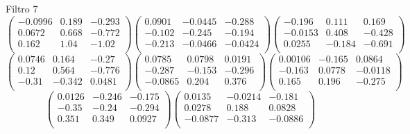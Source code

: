 Filtro 7
{ \small
\[
\begin{pmatrix}
  -0.0996 & 0.189 & -0.293 \\
  0.0672 & 0.668 & -0.772 \\
  0.162 & 1.04 & -1.02 \\
\end{pmatrix}
\begin{pmatrix}
  0.0901 & -0.0445 & -0.288 \\
  -0.102 & -0.245 & -0.194 \\
  -0.213 & -0.0466 & -0.0424 \\
\end{pmatrix}
\begin{pmatrix}
  -0.196 & 0.111 & 0.169 \\
  -0.0153 & 0.408 & -0.428 \\
  0.0255 & -0.184 & -0.691 \\
\end{pmatrix}
\]
\[
\begin{pmatrix}
  0.0746 & 0.164 & -0.27 \\
  0.12 & 0.564 & -0.776 \\
  -0.31 & -0.342 & 0.0481 \\
\end{pmatrix}
\begin{pmatrix}
  0.0785 & 0.0798 & 0.0191 \\
  -0.287 & -0.153 & -0.296 \\
  -0.0865 & 0.204 & 0.376 \\
\end{pmatrix}
\begin{pmatrix}
  0.00106 & -0.165 & 0.0864 \\
  -0.163 & 0.0778 & -0.0118 \\
  0.165 & 0.196 & -0.275 \\
\end{pmatrix}
\]
\[
\begin{pmatrix}
  0.0126 & -0.246 & -0.175 \\
  -0.35 & -0.24 & -0.294 \\
  0.351 & 0.349 & 0.0927 \\
\end{pmatrix}
\begin{pmatrix}
  0.0135 & -0.0214 & -0.181 \\
  0.0278 & 0.188 & 0.0828 \\
  -0.0877 & -0.313 & -0.0886 \\
\end{pmatrix}
\]
}

